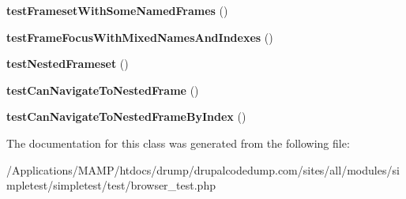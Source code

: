 \begin{DoxyCompactItemize}
\item 
\hypertarget{class_test_of_browser_frames_a438c9f8ad46a37b51cf0a1c921f6768d}{
{\bfseries testFramesetWithSomeNamedFrames} ()}
\label{class_test_of_browser_frames_a438c9f8ad46a37b51cf0a1c921f6768d}

\item 
\hypertarget{class_test_of_browser_frames_a5bf230ff66b8c2d0e69de3f750e34c93}{
{\bfseries testFrameFocusWithMixedNamesAndIndexes} ()}
\label{class_test_of_browser_frames_a5bf230ff66b8c2d0e69de3f750e34c93}

\item 
\hypertarget{class_test_of_browser_frames_ad724e1a274c862f63e7e8d982fde9a0d}{
{\bfseries testNestedFrameset} ()}
\label{class_test_of_browser_frames_ad724e1a274c862f63e7e8d982fde9a0d}

\item 
\hypertarget{class_test_of_browser_frames_ae3646529bedc2adcaea589442b91b389}{
{\bfseries testCanNavigateToNestedFrame} ()}
\label{class_test_of_browser_frames_ae3646529bedc2adcaea589442b91b389}

\item 
\hypertarget{class_test_of_browser_frames_a2d0e0384f7af7e34147aac6526e672a2}{
{\bfseries testCanNavigateToNestedFrameByIndex} ()}
\label{class_test_of_browser_frames_a2d0e0384f7af7e34147aac6526e672a2}

\end{DoxyCompactItemize}


The documentation for this class was generated from the following file:\begin{DoxyCompactItemize}
\item 
/Applications/MAMP/htdocs/drump/drupalcodedump.com/sites/all/modules/simpletest/simpletest/test/browser\_\-test.php\end{DoxyCompactItemize}
